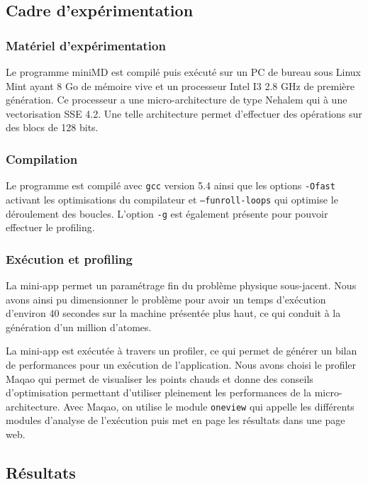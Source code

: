 \documentclass[11pt,a4paper]{article}
\begin{document}
	\subsection{Cadre d'expérimentation}
		
		\subsubsection{Matériel d'expérimentation}

			Le programme miniMD est compilé puis exécuté sur un PC de bureau sous Linux Mint ayant 8 Go de mémoire vive et un processeur Intel I3 2.8 GHz de première génération. Ce processeur a une micro-architecture de type Nehalem qui à une vectorisation SSE 4.2. Une telle architecture permet d'effectuer des opérations sur des blocs de 128 bits.

		\subsubsection{Compilation}

			Le programme est compilé avec \texttt{gcc} version 5.4 ainsi que les options \texttt{-Ofast} activant les optimisations du compilateur et \texttt{--funroll-loops} qui optimise le déroulement des boucles. L'option \texttt{-g} est également présente pour pouvoir effectuer le profiling.

		\subsubsection{Exécution et profiling}

			La mini-app permet un paramétrage fin du problème physique sous-jacent. Nous avons ainsi pu dimensionner le problème pour avoir un temps d'exécution d'environ 40 secondes sur la machine présentée plus haut, ce qui conduit à la génération d'un million d'atomes.

			La mini-app est exécutée à travers un profiler, ce qui permet de générer un bilan de performances pour un exécution de l'application. Nous avons choisi le profiler Maqao qui permet de visualiser les points chauds et donne des conseils d'optimisation permettant d'utiliser pleinement les performances de la micro-architecture. Avec Maqao, on utilise le module \texttt{oneview} qui appelle les différents modules d'analyse de l'exécution puis met en page les résultats dans une page web.

	\subsection{Résultats}
\end{document}

